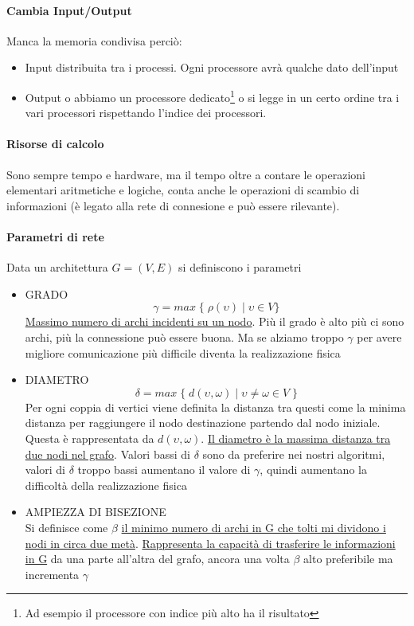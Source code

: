 \paragraph{Cambia Input/Output} 
Manca la memoria condivisa perciò:
\begin{itemize}
    \item Input distribuita tra i processi. Ogni processore avrà qualche dato dell'input
    \item Output o abbiamo un processore dedicato\footnote{Ad esempio il processore con indice più alto ha il risultato} o si legge in un certo ordine tra i vari processori rispettando l'indice dei processori.
\end{itemize}

\paragraph{Risorse di calcolo} Sono sempre tempo e hardware, ma il tempo oltre a contare le operazioni elementari aritmetiche e logiche, conta anche le operazioni di scambio di informazioni (è legato alla rete di connesione e può essere rilevante).

\paragraph{Parametri di rete}
Data un architettura $G=(V,E)$ si definiscono i parametri
\begin{itemize}
    \item GRADO\\
    $$\gamma = max\;\{\;\rho(\upsilon) \;|\; \upsilon \in V \}$$
    \uline{Massimo numero di archi incidenti su un nodo}. Più il grado è alto più ci sono archi, più la connessione può essere buona. Ma se alziamo troppo $\gamma$ per avere migliore comunicazione più difficile diventa la realizzazione fisica
    \item DIAMETRO\\
    $$\delta = max\;\{\;d(\upsilon, \omega)\;|\;\upsilon \neq \omega \in V\;\}$$
    Per ogni coppia di vertici viene definita la distanza tra questi come la minima distanza per raggiungere il nodo destinazione partendo dal nodo iniziale. Questa è rappresentata da $d(\upsilon, \omega)$. \uline{Il diametro è la massima distanza tra due nodi nel grafo}. Valori bassi di $\delta$ sono da preferire nei nostri algoritmi, valori di $\delta$ troppo bassi aumentano il valore di $\gamma$, quindi aumentano la difficoltà della realizzazione fisica 
    \item AMPIEZZA DI BISEZIONE\\
    Si definisce come $\beta$ \uline{il minimo numero di archi in G che tolti mi dividono i nodi in circa due metà}.
    \uline{Rappresenta la capacità di trasferire le informazioni in G} da una parte all'altra del grafo, ancora una volta $\beta$ alto preferibile ma incrementa $\gamma$
\end{itemize}

